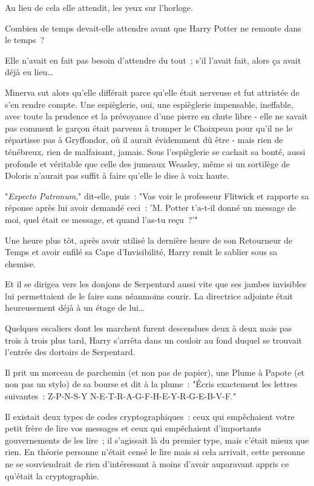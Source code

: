 Au lieu de cela elle attendit, les yeux sur l'horloge.

Combien de temps devait-elle attendre avant que Harry Potter ne remonte dans le temps~?

Elle n'avait en fait pas besoin d'attendre du tout~; s'il l'avait fait, alors ça avait déjà eu lieu…

Minerva sut alors qu'elle différait parce qu'elle était nerveuse et fut attristée de s'en rendre compte. Une espièglerie, oui, une espièglerie impensable, ineffable, avec toute la prudence et la prévoyance d'une pierre en chute libre - elle ne savait pas comment le garçon était parvenu à tromper le Choixpeau pour qu'il ne le répartisse pas à Gryffondor, où il aurait évidemment dû être - mais rien de ténébreux, rien de malfaisant, jamais. Sous l'espièglerie se cachait sa bonté, aussi profonde et véritable que celle des jumeaux Weasley, même si un sortilège de Doloris n'aurait pas suffit à faire qu'elle le dise à voix haute.

"\emph{Expecto Patronum}," dit-elle, puis~: "Vas voir le professeur Flitwick et rapporte sa réponse après lui avoir demandé ceci~: 'M. Potter t'a-t-il donné un message de moi, quel était ce message, et quand l'as-tu reçu~?'"

\later

Une heure plus tôt, après avoir utilisé la dernière heure de son Retourneur de Temps et avoir enfilé sa Cape d'Invisibilité, Harry remit le sablier sous sa chemise.

Et il se dirigea vers les donjons de Serpentard aussi vite que ses jambes invisibles lui permettaient de le faire sans néanmoins courir. La directrice adjointe était heureusement déjà à un étage de lui…

Quelques escaliers dont les marchent furent descendues deux à deux mais pas trois à trois plus tard, Harry s'arrêta dans un couloir au fond duquel se trouvait l'entrée des dortoirs de Serpentard.

Il prit un morceau de parchemin (et non pas de papier), une Plume à Papote (et non pas un stylo) de sa bourse et dit à la plume~: "Écris exactement les lettres suivantes~: Z-P-N-S-Y N-E-T-R-A-G-F-H-E-Y-R-G-E-B-V-F."

Il existait deux types de codes cryptographiques~: ceux qui empêchaient votre petit frère de lire vos messages et ceux qui empêchaient d'importants gouvernements de les lire~; il s'agissait là du premier type, mais c'était mieux que rien. En théorie personne n'était censé le lire mais si cela arrivait, cette personne ne se souviendrait de rien d'intéressant à moins d'avoir auparavant appris ce qu'était la cryptographie.

